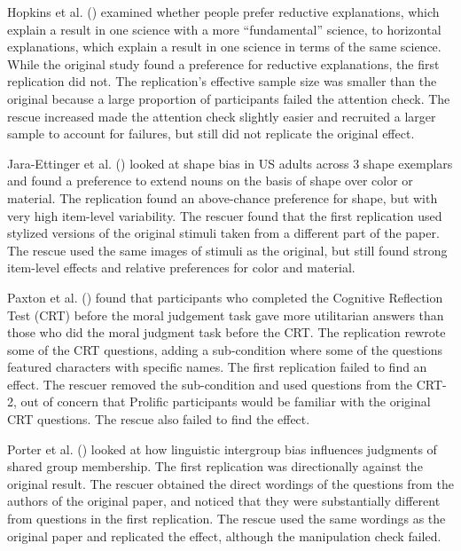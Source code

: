 \documentclass[
  english,
  a4paper,
]{article}
\begin{document}
Hopkins et al. () examined whether people prefer reductive explanations, which explain a result in one science with a more ``fundamental'' science, to horizontal explanations, which explain a result in one science in terms of the same science.
While the original study found a preference for reductive explanations, the first replication did not.
The replication's effective sample size was smaller than the original because a large proportion of participants failed the attention check.
The rescue increased made the attention check slightly easier and recruited a larger sample to account for failures, but still did not replicate the original effect.

Jara-Ettinger et al. () looked at shape bias in US adults across 3 shape exemplars and found a preference to extend nouns on the basis of shape over color or material.
The replication found an above-chance preference for shape, but with very high item-level variability.
The rescuer found that the first replication used stylized versions of the original stimuli taken from a different part of the paper.
The rescue used the same images of stimuli as the original, but still found strong item-level effects and relative preferences for color and material.

Paxton et al. () found that participants who completed the Cognitive Reflection Test (CRT) before the moral judgement task gave more utilitarian answers than those who did the moral judgment task before the CRT.
The replication rewrote some of the CRT questions, adding a sub-condition where some of the questions featured characters with specific names.
The first replication failed to find an effect.
The rescuer removed the sub-condition and used questions from the CRT-2, out of concern that Prolific participants would be familiar with the original CRT questions.
The rescue also failed to find the effect.

Porter et al. () looked at how linguistic intergroup bias influences judgments of shared group membership.
The first replication was directionally against the original result.
The rescuer obtained the direct wordings of the questions from the authors of the original paper, and noticed that they were substantially different from questions in the first replication.
The rescue used the same wordings as the original paper and replicated the effect, although the manipulation check failed.
\end{document}

